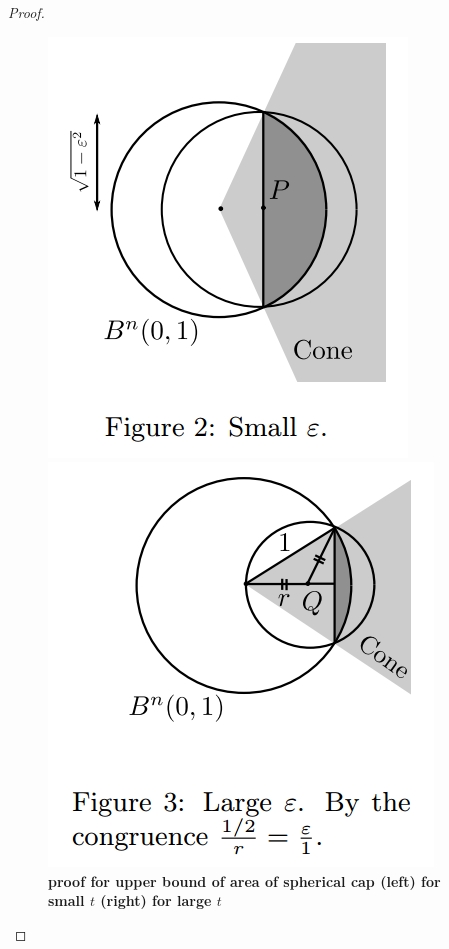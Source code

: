\documentclass[11pt]{article}
\begin{document}
\begin{itemize}
\begin{proof}
\begin{figure}
\begin{minipage}[t]{0.5\linewidth}
  \centering
  \centerline{\includegraphics[scale = 0.4]{spherical_cap_proof.png}}
\end{minipage}
\begin{minipage}[t]{0.5\linewidth}
  \centering
  \centerline{\includegraphics[scale = 0.4]{spherical_cap_proof_2.png}}
\end{minipage}
\caption{\footnotesize{\textbf{proof for upper bound of area of spherical cap (left) for small $t$ (right) for large $t$}}}
\label{fig: spherical_cap_blowup}
\end{figure}



\end{proof}
\end{itemize}
\end{document}
